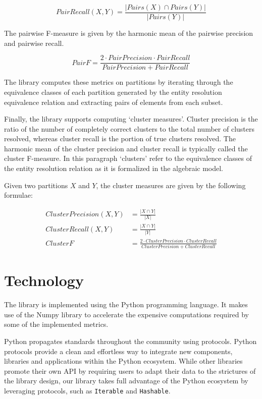 \documentclass[11pt]{article}
\begin{document}
    \[ Pair Recall(X, Y) = \frac{|{Pairs(X)}\cap{Pairs(Y)}|}{|Pairs(Y)|} \]

    The pairwise F-measure is given by the harmonic mean of the pairwise
    precision and pairwise recall.

    \[ Pair F = \frac{2 \cdot Pair Precision \cdot Pair Recall}{Pair Precision + Pair Recall} \]

    The library computes these metrics on partitions by iterating through the
    equivalence classes of each partition generated by the entity resolution
    equivalence relation and extracting pairs of elements from each subset.
    
    Finally, the library supports computing `cluster measures'\cite{hitesh2012}.
    Cluster precision is the ratio of the number of completely correct
    clusters to the total number of clusters resolved, whereas cluster recall
    is the portion of true clusters resolved\cite{huang2006efficient}.
    The harmonic mean of the cluster precision and cluster recall is typically
    called the cluster F-measure.
    In this paragraph `clusters' refer to the equivalence classes of the entity
    resolution relation as it is formalized in the algebraic model.
    
    Given two partitions $X$ and $Y$, the cluster measures are given by the
    following formulae:

    \begin{align*}
        Cluster Precision(X, Y) &= \frac{|{X}\cap{Y}|}{|X|}\\
        Cluster Recall(X, Y) &= \frac{|{X}\cap{Y}|}{|Y|}\\
        Cluster F &= \frac{2\cdot{Cluster Precision}\cdot{Cluster Recall}}{Cluster Precision + Cluster Recall}
    \end{align*}

    \section{Technology}\label{sec:tech}

    The library is implemented using the Python programming language\cite{python}.
    It makes use of the Numpy library\cite{harris2020numpy} to accelerate
    the expensive computations required by some of the implemented metrics.

    Python propagates standards throughout the community using protocols.
    Python protocols\cite{pyproto2017} provide a clean and effortless way to
    integrate new components, libraries and applications within the Python
    ecosystem.
    While other libraries\cite{nmeth2020scipy} promote their own API by
    requiring users to adapt their data to the strictures of the library design,
    our library takes full advantage of the Python ecosystem by leveraging
    protocols, such as \texttt{Iterable} and \texttt{Hashable}.
\end{document}
